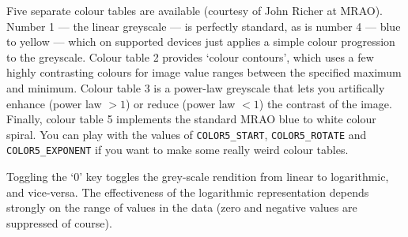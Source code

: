\documentclass[11pt,twoside]{report}
\begin{document}
Five separate colour tables are available (courtesy of John Richer at MRAO).
Number 1 --- the linear greyscale --- is perfectly standard, as is number
4 --- blue to yellow --- which on supported devices just applies a simple
colour progression to the greyscale. Colour table 2 provides `colour contours',
which uses a few highly contrasting colours for image value ranges between
the specified maximum and minimum. Colour table 3 is a power-law
greyscale that lets you artifically enhance (power law $>1$) or reduce (power
law $<1$) the contrast of the image. Finally, colour table 5 implements the
standard MRAO blue to white colour spiral. You can play with the values of
\verb+COLOR5_START+, \verb+COLOR5_ROTATE+ and \verb+COLOR5_EXPONENT+ if you
want to make some really weird colour tables.

Toggling the `0' key toggles the grey-scale rendition from linear to
logarithmic, and vice-versa. The effectiveness of the logarithmic
representation depends strongly on the range of values in the data (zero and
negative values are suppressed of course).
\end{document}
